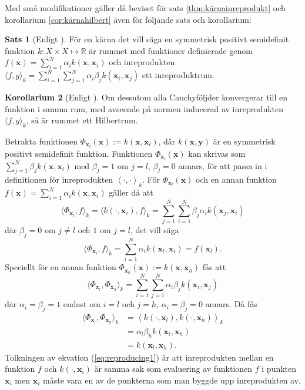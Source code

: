 \documentclass[a4paper, 12pt]{report}
\theoremstyle{definition}
\newtheorem{thm}{Sats}[section]
\newtheorem{cor}[thm]{Korollarium}
\theoremstyle{remark}
\newcommand{\bfx}{\mathbf{x}}
\newcommand{\bfy}{\mathbf{y}}
\newcommand{\llangle}{\left\langle}
\newcommand{\rrangle}{\right\rangle}
\newcommand{\inner}[2]{\llangle #1, #2 \rrangle}
\begin{document}
Med små modifikationer gäller då beviset för sats \ref{thm:kärnainreprodukt} och korollarium \ref{cor:kärnahilbert} även för följande sats och korollarium:
\begin{thm}[Enligt \cite{LearningKernels}]
	För en kärna det vill säga en symmetrisk positivt semidefinit funktion $k: X \times X \longmapsto \mathbb{R}$ är rummet med funktioner definierade genom $f\left(\bfx\right) = \sum_{i=1}^{N}\alpha_ik\left(\bfx, \bfx_i\right)$ och inreprodukten $\langle f, g\rangle_k = \sum_{i=1}^{N}\sum_{j=1}^{N} \alpha_i\beta_jk\left(\bfx_i, \bfx_j\right)$ ett inreproduktrum.
\end{thm}
\begin{cor}[Enligt \cite{LearningKernels}]
	Om dessutom alla Cauchyföljder konvergerar till en funktion i samma rum, med avseende på normen inducerad av inreprodukten $\langle f, g\rangle_k$, så är rummet ett Hilbertrum.
\end{cor}
Betrakta funktionen $\Phi_{\bfx_l}(\bfx):=k\left(\bfx, \bfx_l\right)$, där $k\left(\bfx, \bfy\right)$ är en symmetrisk positivt semidefinit funktion.  Funktionen $\Phi_{\bfx_l}\!(\bfx)$ kan skrivas som $\sum_{j=1}^{N}\!\beta_jk\left(\bfx, \bfx_l\right)$ med $\beta_j=1$ om $j=l$, $\beta_j=0$ annars, för att passa in i definitionen för inreprodukten $\inner{\cdot}{\cdot}_k$. För $\Phi_{\bfx_l}(\bfx)$ och en annan funktion $f\left(\bfx\right) = \sum_{i=1}^{N}\alpha_ik\left(\bfx, \bfx_i\right)$ gäller då att
	\begin{equation*}
		\langle \Phi_{\bfx_l}, f\rangle_k = \langle k\left(\cdot, \bfx_i\right), f\rangle_k = \sum_{j=1}^{N}\sum_{i=1}^{N}\beta_j\alpha_i k\left(\bfx_j, \bfx_i\right)
	\end{equation*}
	där $\beta_j = 0$ om $j\neq l$ och $1$ om $j=l$, det vill säga
	\begin{equation}\label{eq:reproducing1}
		\langle \Phi_{\bfx_l}, f\rangle_k = \sum_{i=1}^{N}\alpha_i k\left(\bfx_l, \bfx_i\right) = f\left(\bfx_l\right).
	\end{equation}
	Speciellt för en annan funktion $\Phi_{\bfx_h}(\bfx):=k\left(\bfx, \bfx_h\right)$ fås att
	\begin{equation*}
		\langle \Phi_{\bfx_l}, \Phi_{\bfx_h} \rangle_k = \sum_{i=1}^{N}\sum_{j=1}^{N}\alpha_i\beta_jk\left(\bfx_i, \bfx_j\right)
	\end{equation*}
	där $\alpha_i=\beta_j=1$ endast om $i=l$ och $j=h$, $\alpha_i=\beta_j=0$ annars. Då fås
	\begin{equation}\label{eq:reproducing2}
	\begin{aligned}
	\langle \Phi_{\bfx_l}, \Phi_{\bfx_h} \rangle_k &= \inner{k\left(\cdot, \bfx_l\right)}{k\left(\cdot, \bfx_h\right)}_k\\ &= \alpha_l\beta_hk\left(\bfx_l, \bfx_h\right)\\&= k\left(\bfx_l, \bfx_h\right).
	\end{aligned}
	\end{equation}
Tolkningen av ekvation (\ref{eq:reproducing1}) är att inreprodukten mellan en funktion $f$ och $k\left(\cdot, \bfx_i\right)$ är samma sak som evaluering av funktionen $f$ i punkten $\bfx_i$ men $\bfx_i$ måste vara en av de punkterna som man byggde upp inreprodukten av.
\end{document}
